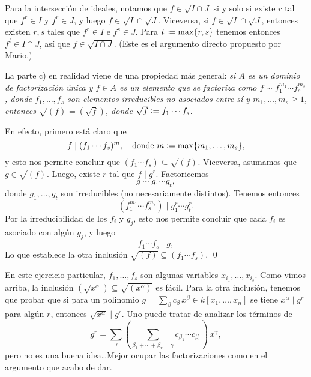 \documentclass{article}
\theoremstyle{definition}
\begin{document}
Para la intersección de ideales, notamos que $f \in \sqrt{I\cap J}$ si y solo si
existe $r$ tal que $f^r \in I$ y $f^r \in J$, y luego
$f \in \sqrt{I} \cap \sqrt{J}$. Viceversa, si $f \in \sqrt{I} \cap \sqrt{J}$,
entonces existen $r,s$ tales que $f^r \in I$ e $f^s \in J$. Para
$t \mathrel{\mathop:}= \max \{ r, s \}$ tenemos entonces $f^t \in I\cap J$, así que
$f \in \sqrt{I\cap J}$. (Este es el argumento directo propuesto por Mario.)

\vspace{1em}

La parte c) en realidad viene de una propiedad más general: \emph{si $A$ es un
  dominio de factorización única y $f \in A$ es un elemento que se factoriza
  como $f \sim f_1^{m_1}\cdots f_s^{m_s}$, donde $f_1,\ldots,f_s$ son elementos
  irreducibles no asociados entre sí y $m_1,\ldots,m_s\ge 1$, entonces
  $\sqrt{(f)} = (\sqrt{f})$, donde $\sqrt{f} \mathrel{\mathop:}= f_1\cdots f_s$}.

\vspace{1em}

En efecto, primero está claro que
$$f \mid (f_1\cdots f_s)^m, \quad\text{donde }m \mathrel{\mathop:}= \max \{ m_1,\ldots,m_s \},$$
y esto nos permite concluir que $(f_1\cdots f_s) \subseteq \sqrt{(f)}$.
Viceversa, asumamos que $g \in \sqrt{(f)}$. Luego, existe $r$ tal que
$f \mid g^r$. Factoricemos
$$g \sim g_1\cdots g_t,$$
donde $g_1,\ldots, g_t$ son irreducibles (no necesariamente distintos). Tenemos
entonces
$$(f_1^{m_1}\cdots f_s^{m_s}) \mid g_1^r\cdots g_t^r.$$
Por la irreducibilidad de los $f_i$ y $g_j$, esto nos permite concluir que cada
$f_i$ es asociado con algún $g_j$, y luego
$$f_1\cdots f_s \mid g,$$
Lo que establece la otra inclusión $\sqrt{(f)} \subseteq (f_1\cdots f_s)$. \qed

\vspace{1em}

En este ejercicio particular, $f_1,\ldots,f_s$ son algunas variables
$x_{i_1},\ldots,x_{i_s}$. Como vimos arriba, la inclusión
${(\sqrt{x^\alpha}) \subseteq \sqrt{(x^\alpha)}}$ es fácil. Para la otra
inclusión, tenemos que probar que si para un polinomio
$g = \sum_\beta c_\beta\,x^\beta \in k [x_1,\ldots,x_n]$ se tiene
$x^\alpha \mid g^r$ para algún $r$, entonces $\sqrt{x^\alpha} \mid g^r$.
Uno puede tratar de analizar los términos de
$$g^r = \sum_\gamma \left(\sum_{\beta_1 + \cdots + \beta_r = \gamma} c_{\beta_1}\cdots c_{\beta_r}\right)\,x^\gamma,$$
pero no es una buena idea\dots Mejor ocupar las factorizaciones como en el
argumento que acabo de dar.

\vspace{1em}
\end{document}
